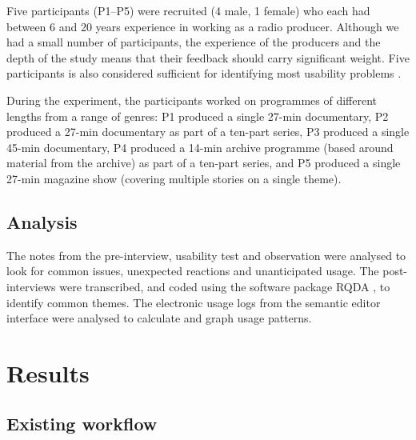 Five participants (P1--P5) were recruited (4 male, 1 female) who each had between 6 and 20 years experience in working
as a radio producer. Although we had a small number of participants, the experience of the producers and the depth of
the study means that their feedback should carry significant weight. Five participants is also considered sufficient
for identifying most usability problems \citep{Nielsen1993}.

During the experiment, the participants worked on programmes of different lengths from a range of genres:
P1 produced a single 27-min documentary, %
P2 produced a 27-min documentary as part of a ten-part series,
P3 produced a single 45-min documentary,
P4 produced a 14-min archive programme (based around material from the archive) as part of a ten-part series, and
P5 produced a single 27-min magazine show (covering multiple stories on a single theme).

\subsection{Analysis}
The notes from the pre-interview, usability test and observation were analysed to look for common issues, unexpected
reactions and unanticipated usage. The post-interviews were transcribed, and coded using the software package RQDA
\citep{RQDA}, to identify common themes. The electronic usage logs from the semantic editor interface were analysed to
calculate and graph usage patterns.


\section{Results}\label{sec:screen-results}
\subsection{Existing workflow}\label{sec:screen-results-existing}


